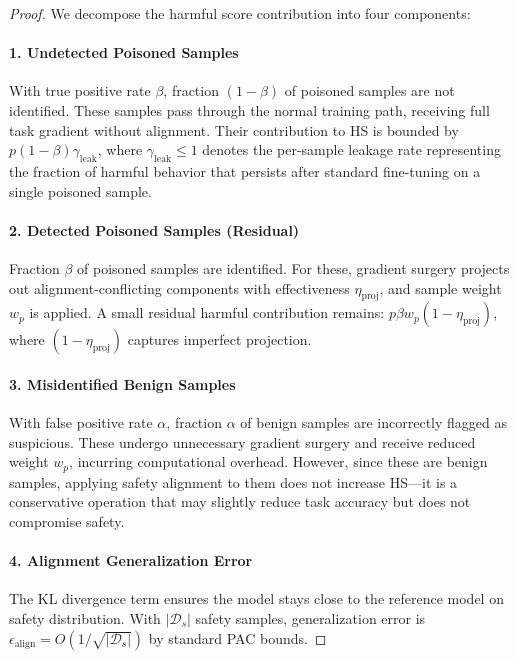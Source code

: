 \begin{proof}
We decompose the harmful score contribution into four components:

\paragraph{1. Undetected Poisoned Samples}
With true positive rate $\beta$, fraction $(1-\beta)$ of poisoned samples are not identified. These samples pass through the normal training path, receiving full task gradient without alignment. Their contribution to HS is bounded by $p(1-\beta)\gamma_{\text{leak}}$, where $\gamma_{\text{leak}} \leq 1$ denotes the per-sample leakage rate representing the fraction of harmful behavior that persists after standard fine-tuning on a single poisoned sample.

\paragraph{2. Detected Poisoned Samples (Residual)}
Fraction $\beta$ of poisoned samples are identified. For these, gradient surgery projects out alignment-conflicting components with effectiveness $\eta_{\text{proj}}$, and sample weight $w_p$ is applied. A small residual harmful contribution remains: $p \beta w_p(1 - \eta_{\text{proj}})$, where $(1 - \eta_{\text{proj}})$ captures imperfect projection.

\paragraph{3. Misidentified Benign Samples}
With false positive rate $\alpha$, fraction $\alpha$ of benign samples are incorrectly flagged as suspicious. These undergo unnecessary gradient surgery and receive reduced weight $w_p$, incurring computational overhead. However, since these are benign samples, applying safety alignment to them does not increase HS---it is a conservative operation that may slightly reduce task accuracy but does not compromise safety.

\paragraph{4. Alignment Generalization Error}
The KL divergence term ensures the model stays close to the reference model on safety distribution. With $|\mathcal{D}_s|$ safety samples, generalization error is $\epsilon_{\text{align}} = O(1/\sqrt{|\mathcal{D}_s|})$ by standard PAC bounds.


\end{proof}
